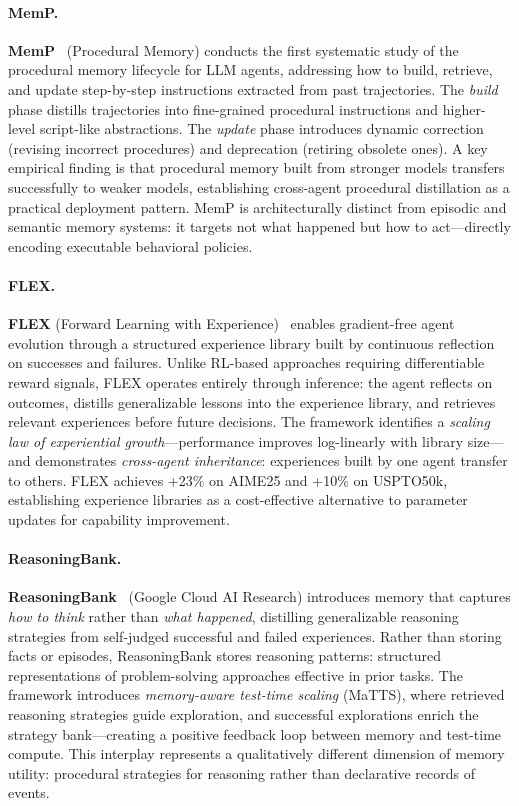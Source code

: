 \paragraph{MemP.}
\textbf{MemP}~\cite{memp2025} (Procedural Memory) conducts the first
systematic study of the procedural memory lifecycle for LLM agents,
addressing how to build, retrieve, and update step-by-step instructions
extracted from past trajectories.  The \emph{build} phase distills
trajectories into fine-grained procedural instructions and higher-level
script-like abstractions.  The \emph{update} phase introduces dynamic
correction (revising incorrect procedures) and deprecation (retiring
obsolete ones).  A key empirical finding is that procedural memory
built from stronger models transfers successfully to weaker models,
establishing cross-agent procedural distillation as a practical
deployment pattern.  MemP is architecturally distinct from episodic
and semantic memory systems: it targets not what happened but how to
act---directly encoding executable behavioral policies.

\paragraph{FLEX.}
\textbf{FLEX} (Forward Learning with
Experience)~\cite{flex2025} enables gradient-free agent evolution
through a structured experience library built by continuous reflection
on successes and failures.  Unlike RL-based approaches requiring
differentiable reward signals, FLEX operates entirely through inference:
the agent reflects on outcomes, distills generalizable lessons into the
experience library, and retrieves relevant experiences before future
decisions.  The framework identifies a \emph{scaling law of experiential
growth}---performance improves log-linearly with library size---and
demonstrates \emph{cross-agent inheritance}: experiences built by one
agent transfer to others. FLEX achieves +23\% on AIME25 and
+10\% on USPTO50k, establishing experience libraries as a
cost-effective alternative to parameter updates for capability
improvement.

\paragraph{ReasoningBank.}
\textbf{ReasoningBank}~\cite{reasoningbank2025} (Google Cloud AI
Research) introduces memory that captures \emph{how to think} rather
than \emph{what happened}, distilling generalizable reasoning strategies
from self-judged successful and failed experiences.  Rather than storing
facts or episodes, ReasoningBank stores reasoning patterns: structured
representations of problem-solving approaches effective in prior tasks.
The framework introduces \emph{memory-aware test-time scaling}
(MaTTS), where retrieved reasoning strategies guide exploration, and
successful explorations enrich the strategy bank---creating a positive
feedback loop between memory and test-time compute.  This interplay
represents a qualitatively different dimension of memory utility:
procedural strategies for reasoning rather than declarative records of
events.

